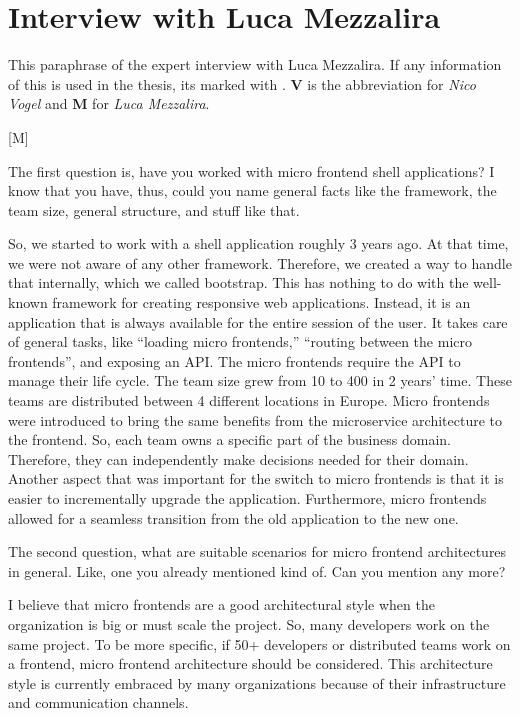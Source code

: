 
\section{Interview with Luca Mezzalira}

This paraphrase of the expert interview with Luca Mezzalira.
If any information of this is used in the thesis, its marked with \cite{Vogel.2020.Mezzalira}.
\textbf{V} is the abbreviation for \textit{Nico Vogel} and \textbf{M} for \textit{Luca Mezzalira}.

[M]

\begin{description}
    \NicoVogel The first question is, have you worked with micro frontend shell applications? I know that you have, thus, could you name general facts like the framework, the team size, general structure, and stuff like that.

    \LucaMezzalira So, we started to work with a shell application roughly 3 years ago. At that time, we were not aware of any other framework. Therefore, we created a way to handle that internally, which we called bootstrap. This has nothing to do with the well-known framework for creating responsive web applications. Instead, it is an application that is always available for the entire session of the user. It takes care of general tasks, like “loading micro frontends,” “routing between the micro frontends”, and exposing an API. The micro frontends require the API to manage their life cycle.
    The team size grew from 10 to 400 in 2 years’ time. These teams are distributed between 4 different locations in Europe.
    Micro frontends were introduced to bring the same benefits from the microservice architecture to the frontend. So, each team owns a specific part of the business domain. Therefore, they can independently make decisions needed for their domain.
    Another aspect that was important for the switch to micro frontends is that it is easier to incrementally upgrade the application. Furthermore, micro frontends allowed for a seamless transition from the old application to the new one.

    \NicoVogel The second question, what are suitable scenarios for micro frontend architectures in general. Like, one you already mentioned kind of. Can you mention any more?

    \LucaMezzalira I believe that micro frontends are a good architectural style when the organization is big or must scale the project. So, many developers work on the same project. To be more specific, if 50+ developers or distributed teams work on a frontend, micro frontend architecture should be considered. This architecture style is currently embraced by many organizations because of their infrastructure and communication channels.


\end{description}

